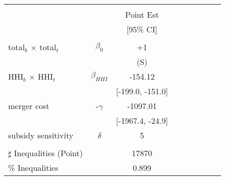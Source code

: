 \begin{tabular}{@{\extracolsep{5pt}}lcc}
\toprule 
 &  &  \\
 &  & Point Est \\
 &  & [95\% CI] \\
\midrule 
 &  &  \\
total$_{b}$ $\times$ total$_{t}$ & $\beta_0$ & +1 \\
 &  & (S) \\
HHI$_{b}$ $\times$ HHI$_{t}$ & $\beta_{HHI}$ & -154.12 \\
 &  & [-199.0, -151.0] &  &  &  &  &  &  &  \\
merger cost & -$\gamma$ & -1097.01 \\
 &  & [-1967.4, -24.9] \\
subsidy sensitivity & $\delta$ & 5 \\
 &  &  &  &  &  &  &  &  &  \\
\hline 
$\sharp$ Inequalities (Point) &  & 17870 \\
\% Inequalities &  & 0.899 \\
\bottomrule 
\end{tabular}
